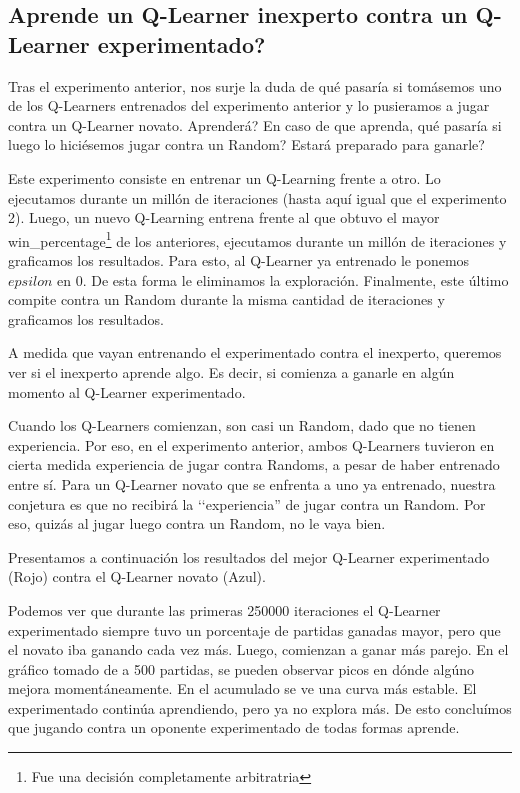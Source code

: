 \subsection{Aprende un Q-Learner inexperto contra un Q-Learner experimentado?}

Tras el experimento anterior, nos surje la duda de qué pasaría si tomásemos uno de los Q-Learners entrenados del experimento anterior y lo pusieramos a jugar contra un Q-Learner novato. Aprenderá? En caso de que aprenda, qué pasaría si luego lo hiciésemos jugar contra un Random? Estará preparado para ganarle?

Este experimento consiste en entrenar un Q-Learning frente a otro. Lo ejecutamos durante un mill\'on de iteraciones (hasta aqu\'i igual que el experimento 2). Luego, un nuevo Q-Learning entrena frente al que obtuvo el mayor win\_percentage\footnote{Fue una decisi\'on completamente arbitratria} de los anteriores, ejecutamos durante un mill\'on de iteraciones y graficamos los resultados. Para esto, al Q-Learner ya entrenado le ponemos $epsilon$ en 0. De esta forma le eliminamos la exploración. Finalmente, este \'ultimo compite contra un Random durante la misma cantidad de iteraciones y graficamos los resultados.

A medida que vayan entrenando el experimentado contra el inexperto, queremos ver si el inexperto aprende algo. Es decir, si comienza a ganarle en algún momento al Q-Learner experimentado.

Cuando los Q-Learners comienzan, son casi un Random, dado que no tienen experiencia. Por eso, en el experimento anterior, ambos Q-Learners tuvieron en cierta medida experiencia de jugar contra Randoms, a pesar de haber entrenado entre sí. Para un Q-Learner novato que se enfrenta a uno ya entrenado, nuestra conjetura es que no recibirá la ‘‘experiencia'' de jugar contra un Random. Por eso, quizás al jugar luego contra un Random, no le vaya bien.

Presentamos a continuación los resultados del mejor Q-Learner experimentado (Rojo) contra el Q-Learner novato (Azul).



Podemos ver que durante las primeras 250000 iteraciones el Q-Learner experimentado siempre tuvo un porcentaje de partidas ganadas mayor, pero que el novato iba ganando cada vez más. Luego, comienzan a ganar más parejo. En el gráfico tomado de a 500 partidas, se pueden observar picos en dónde algúno mejora momentáneamente. En el acumulado se ve una curva más estable. El experimentado continúa aprendiendo, pero ya no explora más. De esto concluímos que jugando contra un oponente experimentado de todas formas aprende.

